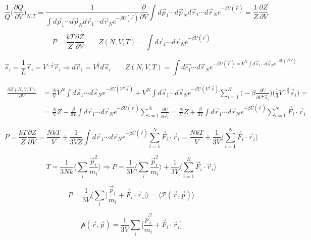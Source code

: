 	$$\frac{1}{Q}\biggl(\frac{\partial Q}{\partial V}\biggr)_{N, T} = \frac{1}{\int d\vec{p}_1\cdots d\vec{p}_Nd\vec{r}_1\cdots d\vec{r}_Ne^{-\beta U(\vec{r})}}\frac{\partial}{\partial V}\int d\vec{p}_1\cdots d\vec{p}_Nd\vec{r}_1\cdots d\vec{r}_N e^{-\beta U(\vec{r})} = \frac{1}{Z}\frac{\partial Z}{\partial V}$$


	$$P = \frac{kT}{Z}\frac{\partial Z}{\partial V}\qquad Z(N, V, T) = \int d\vec{r}_1\cdots d\vec{r}_Ne^{-\beta U(\vec{r})}$$

	$$\vec{s}_i = \frac{1}{L}\vec{r}_i = V^{-\frac{1}{3}}\vec{r}_i \Rightarrow d\vec{r}_1 = V^{\frac{1}{3}}d\vec{s}_i\qquad Z(N, V, T) = \int d\vec{r_1}\cdots d\vec{r}_Ne^{-\beta U(\vec{r}) = V^N\int d\vec{s}_1\cdots d\vec{s}_Ne^{-\beta U(V^{\frac{1}{3}}\vec{s})}}$$

	\begin{align*}
		\frac{\partial Z(N, V, T)}{\partial V} &= \frac{N}{V}V^N\int d\vec{s}_1\cdots d\vec{s}_Ne^{-\beta U(V^{\frac{1}{3}}\vec{s})} + V^N\int d\vec{s}_1\cdots d\vec{s}_Ne^{-\beta U(V^{\frac{1}{3}}\vec{s})}\sum\limits_{i=1}^N\biggl(-\beta\frac{\partial U}{\partial V^{\frac{1}{3}}\vec{s}_i}\biggr)\biggl(\frac{1}{3}V^{-\frac{2}{3}}\vec{s}_i\biggr) = \\
																					 &=\frac{N}{V}Z - \frac{\beta}{3V}\int d\vec{r}_1\cdots d\vec{r}_Ne^{-\beta U(\vec{r})}\sum\limits_{i=1}^N\frac{\partial U}{\partial\vec{r}_i} = \frac{N}{V}Z + \frac{\beta}{3V}\int d\vec{r}_1\cdots d\vec{r}_Ne^{-\beta U(\vec{r})}\sum\limits_{i=1}^N\vec{F}_i\cdot\vec{r}_i
	\end{align*}

	$$P = \frac{kT}{Z}\frac{\partial Z}{\partial V} = \frac{NkT}{V} + \frac{1}{3VZ}\int d\vec{r}_1\cdots d\vec{r}_N e^{-\beta U(\vec{r})}\sum\limits_{i=1}^N\vec{F}_i\cdot\vec{r}_i = \frac{NkT}{V} + \frac{1}{3V}\biggl\langle\sum\limits_{i=1}^N\vec{F}_i\cdot\vec{r}_i\biggr\rangle$$

	$$T = \frac{1}{3Nk}\biggl\langle\sum\limits_i\frac{\vec{p}_i^2}{m_i}\biggr\rangle\Rightarrow P = \frac{1}{3V}\biggl\langle\sum\limits_i\frac{\vec{p}^2_i}{m_i}\biggr\rangle + \frac{1}{3V}\biggl\langle\sum\limits_{i=1}^N\vec{F}_i\cdot\vec{r}_i\biggr\rangle$$

	$$P = \frac{1}{3V}\biggl\langle\sum\limits_i\biggl[\frac{\vec{p}_i}{m_i}+ \vec{F}_i\cdot\vec{r}_i\biggr]\biggr\rangle = \langle\mathcal{P}(\vec{r}, \vec{p})\rangle$$

	$$\mathcal{p}(\vec{r}, \vec{p}) = \frac{1}{3V}\sum\limits_i\biggl[\frac{\vec{p}_i^2}{m_i}+ \vec{F}_i\cdot\vec{r}_i\biggr]$$
